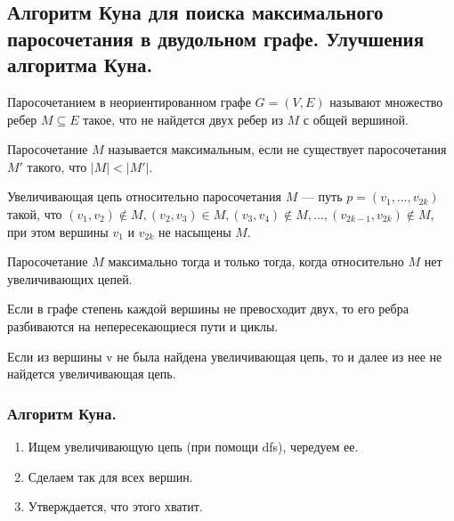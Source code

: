 \documentclass[a4paper,14pt]{article}
\begin{document}
    \subsection{Алгоритм Куна для поиска максимального паросочетания в двудольном графе. Улучшения алгоритма Куна.}
    \label{subsec:kunas_algorithm}
    \begin{Def}
        Паросочетанием в неориентированном графе $G = (V,E)$ называют
    множество ребер $M \subseteq E$ такое, что не найдется двух ребер из $M$ с
    общей вершиной.
    \end{Def} 
    \begin{Def}
        Паросочетание $M$ называется максимальным, если не существует
паросочетания $M'$ такого, что $|M| < |M'|$. 
    \end{Def}
    \begin{Def}
        Увеличивающая цепь относительно паросочетания $M$ — путь
    $p = (v_1,\ldots,v_{2k} )$ такой, что $(v_1,v_2) \notin M, (v_2,v_3) \in M, (v_3,v_4) \notin M, \ldots,
    (v_{2k-1},v_{2k} ) \notin M$, при этом вершины $v_1$ и $v_{2k}$ не насыщены $M$.
    \end{Def}
    \begin{theorem}[Бержа]
        Паросочетание $M$ максимально тогда и только тогда, когда относительно $M$ нет увеличивающих цепей.
    \end{theorem}
    \begin{lemma}
        Если в графе степень каждой вершины не превосходит двух, то его ребра разбиваются на непересекающиеся пути и циклы.
    \end{lemma}
    \begin{lemma}
        Если из вершины v не была найдена увеличивающая цепь, то и далее из нее не найдется увеличивающая цепь.
    \end{lemma}
    \subsubsection*{Алгоритм Куна.}
    \begin{enumerate}
        \item Ищем увеличивающую цепь (при помощи dfs), чередуем ее.
        \item Сделаем так для всех вершин.
        \item Утверждается, что этого хватит.
    \end{enumerate}
\end{document}
